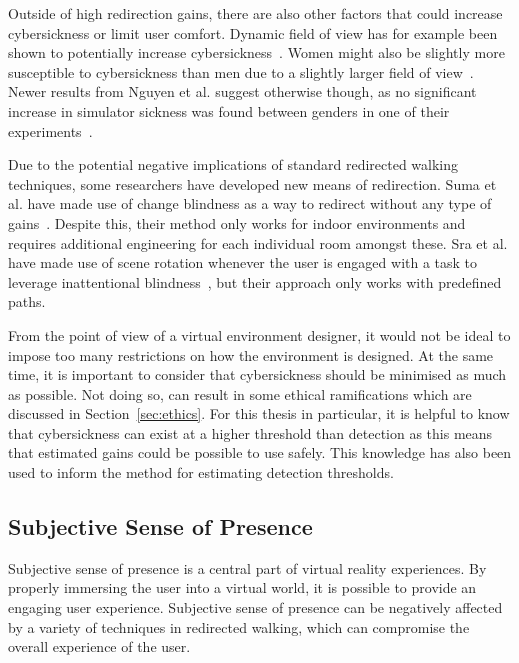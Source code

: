 Outside of high redirection gains, there are also other factors that could increase cybersickness or limit user comfort. Dynamic field of view has for example been shown to potentially increase cybersickness~\cite{norouzi2018assessing}. Women might also be slightly more susceptible to cybersickness than men due to a slightly larger field of view~\cite{hildebrandt2018get}. Newer results from Nguyen et al. suggest otherwise though, as no significant increase in simulator sickness was found between genders in one of their experiments~\cite{nguyen2018individual}.

Due to the potential negative implications of standard redirected walking techniques, some researchers have developed new means of redirection. Suma et al. have made use of change blindness as a way to redirect without any type of gains~\cite{suma2011leveraging}. Despite this, their method only works for indoor environments and requires additional engineering for each individual room amongst these. Sra et al. have made use of scene rotation whenever the user is engaged with a task to leverage inattentional blindness~\cite{sra2018vmotion}, but their approach only works with predefined paths. 

From the point of view of a virtual environment designer, it would not be ideal to impose too many restrictions on how the environment is designed. At the same time, it is important to consider that cybersickness should be minimised as much as possible. Not doing so, can result in some ethical ramifications which are discussed in Section~\ref{sec:ethics}. For this thesis in particular, it is helpful to know that cybersickness can exist at a higher threshold than detection as this means that estimated gains could be possible to use safely. This knowledge has also been used to inform the method for estimating detection thresholds. 

\subsection{Subjective Sense of Presence}
Subjective sense of presence is a central part of virtual reality experiences. By properly immersing the user into a virtual world, it is possible to provide an engaging user experience. Subjective sense of presence can be negatively affected by a variety of techniques in redirected walking, which can compromise the overall experience of the user. 

